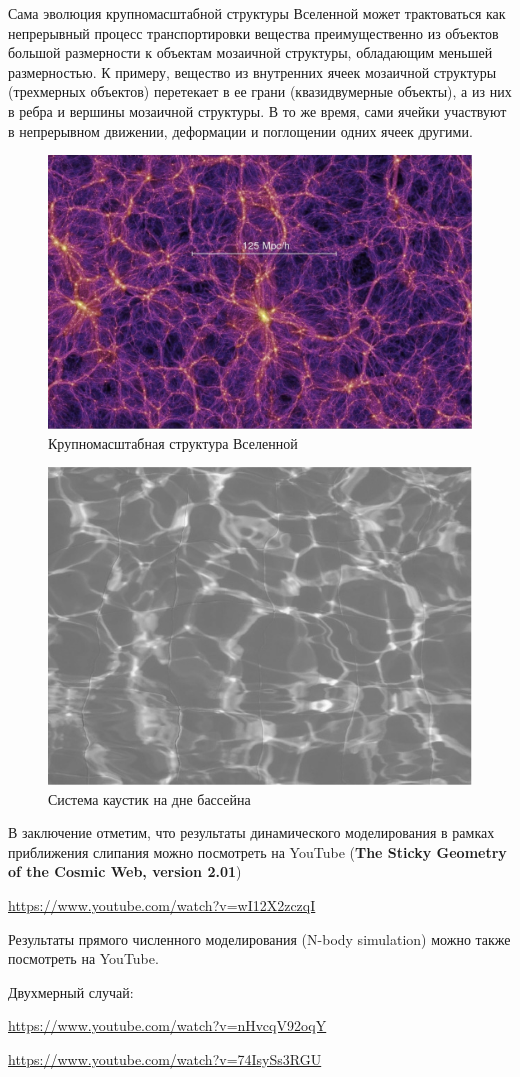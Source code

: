 Сама эволюция крупномасштабной структуры Вселенной может трактоваться как непрерывный процесс транспортировки вещества преимущественно из объектов большой размерности к объектам мозаичной структуры, обладающим меньшей размерностью. К примеру, вещество из внутренних ячеек мозаичной структуры (трехмерных объектов) перетекает в ее грани (квазидвумерные объекты), а из них в ребра и вершины мозаичной структуры. В то же время, сами ячейки участвуют в непрерывном движении, деформации и поглощении одних ячеек другими.

\begin{figure}[h!]
	\centering
	\includegraphics[width=.5\linewidth]{photo/1}
	\caption{Крупномасштабная структура Вселенной}
	\label{fig:figure1}
\end{figure}
\begin{figure}[h!]
	\centering
	\includegraphics[width=.5\linewidth]{photo/2}
	\caption{Система каустик на дне бассейна}
	\label{fig:figure2}
\end{figure}
В заключение отметим, что результаты динамического моделирования в рамках приближения слипания можно посмотреть на YouTube (\textbf{The Sticky Geometry of the Cosmic Web, version 2.01})

\url{https://www.youtube.com/watch?v=wI12X2zczqI}

Результаты прямого численного моделирования (N-body simulation) можно также  посмотреть на YouTube.

Двухмерный случай:

\url{https://www.youtube.com/watch?v=nHvcqV92oqY}

\url{https://www.youtube.com/watch?v=74IsySs3RGU}

